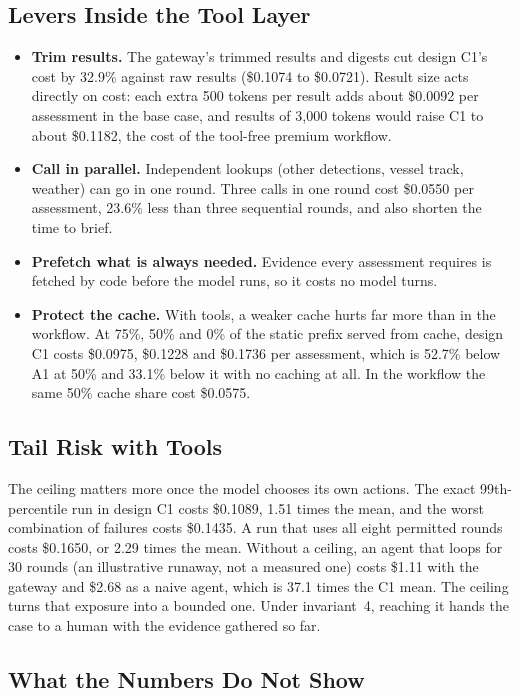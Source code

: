 \documentclass[conference]{IEEEtran}
\begin{document}
\subsection{Levers Inside the Tool Layer}

\begin{itemize}
\item \textbf{Trim results.} The gateway's trimmed results and digests cut design C1's cost by 32.9\% against raw results (\$0.1074 to \$0.0721). Result size acts directly on cost: each extra 500 tokens per result adds about \$0.0092 per assessment in the base case, and results of 3,000 tokens would raise C1 to about \$0.1182, the cost of the tool-free premium workflow.
\item \textbf{Call in parallel.} Independent lookups (other detections, vessel track, weather) can go in one round. Three calls in one round cost \$0.0550 per assessment, 23.6\% less than three sequential rounds, and also shorten the time to brief.
\item \textbf{Prefetch what is always needed.} Evidence every assessment requires is fetched by code before the model runs, so it costs no model turns.
\item \textbf{Protect the cache.} With tools, a weaker cache hurts far more than in the workflow. At 75\%, 50\% and 0\% of the static prefix served from cache, design C1 costs \$0.0975, \$0.1228 and \$0.1736 per assessment, which is 52.7\% below A1 at 50\% and 33.1\% below it with no caching at all. In the workflow the same 50\% cache share cost \$0.0575.
\end{itemize}

\subsection{Tail Risk with Tools}

The ceiling matters more once the model chooses its own actions. The exact 99th-percentile run in design C1 costs \$0.1089, 1.51 times the mean, and the worst combination of failures costs \$0.1435. A run that uses all eight permitted rounds costs \$0.1650, or 2.29 times the mean. Without a ceiling, an agent that loops for 30 rounds (an illustrative runaway, not a measured one) costs \$1.11 with the gateway and \$2.68 as a naive agent, which is 37.1 times the C1 mean. The ceiling turns that exposure into a bounded one. Under invariant~4, reaching it hands the case to a human with the evidence gathered so far.

\subsection{What the Numbers Do Not Show}
\end{document}
